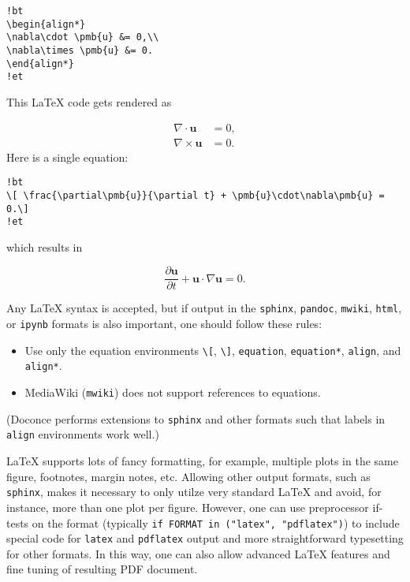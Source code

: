 \documentclass[%
oneside,                 %
final,                   %
10pt]{article}
\newenvironment{graybox1admon}[1][]{
\begin{graybox1mdframed}[frametitle=#1]
}
{
\end{graybox1mdframed}
}
\begin{document}
\begin{Verbatim}[numbers=none,fontsize=\fontsize{9pt}{9pt},baselinestretch=0.85,xleftmargin=0mm]
!bt
\begin{align*}
\nabla\cdot \pmb{u} &= 0,\\ 
\nabla\times \pmb{u} &= 0.
\end{align*}
!et
\end{Verbatim}

This {\LaTeX} code gets rendered as

\begin{align*}
\nabla\cdot \pmb{u} &= 0,\\ 
\nabla\times \pmb{u} &= 0.
\end{align*}
Here is a single equation:

\begin{Verbatim}[numbers=none,fontsize=\fontsize{9pt}{9pt},baselinestretch=0.85,xleftmargin=0mm]
!bt
\[ \frac{\partial\pmb{u}}{\partial t} + \pmb{u}\cdot\nabla\pmb{u} = 0.\]
!et
\end{Verbatim}
which results in

\[ \frac{\partial\pmb{u}}{\partial t} + \pmb{u}\cdot\nabla\pmb{u} = 0.\]

Any {\LaTeX} syntax is accepted, but if output in the \Verb!sphinx!, \Verb!pandoc!,
\Verb!mwiki!, \Verb!html!, or \Verb!ipynb! formats
is also important, one should follow these rules:

\begin{itemize}
  \item Use only the equation environments \Verb!\[!, \Verb!\]!,
    \Verb!equation!, \Verb!equation*!, \Verb!align!, and \Verb!align*!.

  \item MediaWiki (\Verb!mwiki!) does not support references to equations.
\end{itemize}

\noindent
(Doconce performs extensions to \Verb!sphinx! and other formats such that
labels in \Verb!align! environments work well.)


\begin{graybox1admon}[Notice.]
{\LaTeX} supports lots of fancy formatting, for example, multiple
plots in the same figure, footnotes, margin notes, etc.
Allowing other output formats, such as \Verb!sphinx!, makes it necessary
to only utilze very standard {\LaTeX} and avoid, for instance, more than
one plot per figure. However, one can use preprocessor if-tests on
the format (typically \Verb!if FORMAT in ("latex", "pdflatex")!) to
include special code for \Verb!latex! and \Verb!pdflatex! output and more
straightforward typesetting for other formats. In this way, one can
also allow advanced {\LaTeX} features and fine tuning of resulting
PDF document.
\end{graybox1admon}
\end{document}
